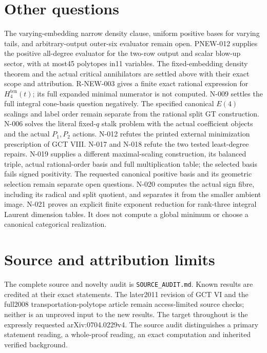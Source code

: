 \documentclass[11pt]{article}
\theoremstyle{definition}\newtheorem{definition}[theorem]{Definition}
\theoremstyle{remark}\newtheorem{remark}[theorem]{Remark}
\begin{document}
\section{Other questions}
The varying-embedding narrow density clause, uniform positive bases
for varying tails, and arbitrary-output outer-six evaluator remain open.
PNEW-012 supplies the positive all-degree evaluator for the two-row
output and scalar blow-up sector, with at most45 polytopes in11 variables.
The fixed-embedding density theorem and the actual critical
annihilators are settled above with their exact scope and attribution.
R-NEW-003 gives a finite exact rational expression for
$H^{\mathrm{ten}}_4(t)$; its full expanded minimal numerator is
not computed. N-009 settles the full integral cone-basis
question negatively. The specified canonical $E(4)$ scalings and
label order remain separate from the rational split GT construction.
N-006 solves the literal fixed-$q$ stalk problem with the actual
coefficient objects and the actual $P_1,P_2$ actions. N-012 refutes
the printed external minimization prescription of GCT VIII.
N-017 and N-018 refute the two tested least-degree repairs.
N-019 supplies a different maximal-scaling construction, its balanced
triple, actual rational-order basis and full multiplication table;
the selected basis fails signed positivity. The requested canonical
positive basis and its geometric selection remain separate open questions.
N-020 computes the actual sign fibre, including its radical and split
quotient, and separates it from the smaller ambient image. N-021 proves
an explicit finite exponent reduction for rank-three integral Laurent
dimension tables. It does not compute a global minimum or choose a
canonical categorical realization.

\section{Source and attribution limits}
The complete source and novelty audit is \texttt{SOURCE\_AUDIT.md}.
Known results are credited at their exact statements.  The later2011
revision of GCT VI and the full2008 transportation-polytope article
remain access-limited source checks; neither is an unproved input to
the new results.  The target throughout is the expressly requested
arXiv:0704.0229v4.  The source audit distinguishes a primary statement
reading, a whole-proof reading, an exact computation and inherited
verified background.
\end{document}
